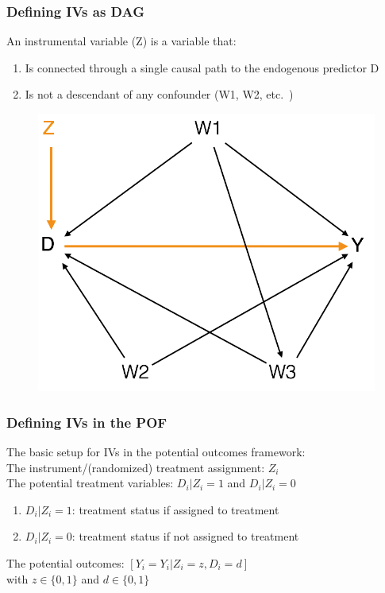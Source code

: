 \documentclass[12pt,english,dvipsnames,aspectratio=169,handout]{beamer}\usepackage[]{graphicx}\usepackage[]{xcolor}
\begin{document}
\begin{frame}
  \frametitle{Defining IVs as DAG}
  An instrumental variable (Z) is a variable that:
	\begin{enumerate} 
		\item Is connected through a single causal path to the endogenous predictor D
		\item Is not a descendant of any confounder (W1, W2, etc.\ )
	\end {enumerate}
	\begin{figure} 
    \includegraphics[height=.45\textheight,keepaspectratio=true]{../04-figures/05/06-w5_dag_6.png}
    \end{figure}
\end{frame}



\begin{frame}
  \frametitle{Defining IVs in the POF}
The basic setup for IVs in the potential outcomes framework:\\ \footnotesize
    \vspace{3mm}
    The instrument/(randomized) treatment assignment: $Z_i$  \\
    The potential treatment variables: $D_{i}|Z_{i} = 1$ and $D_{i}|Z_{i} = 0$
  \begin{enumerate} \footnotesize
  	\item $D_{i}|Z_i=1$: treatment status if assigned to treatment
	 \item $D_{i}|Z_i=0$: treatment status if not assigned to treatment
  \end{enumerate}
    The potential outcomes: $[Y_i = Y_i|Z_i=z,D_i=d]$ \\ 
    with $z \in \{0,1\}$ and $d \in \{0,1\}$  \\
    \vspace{3cm}
\end{frame}
\end{document}

